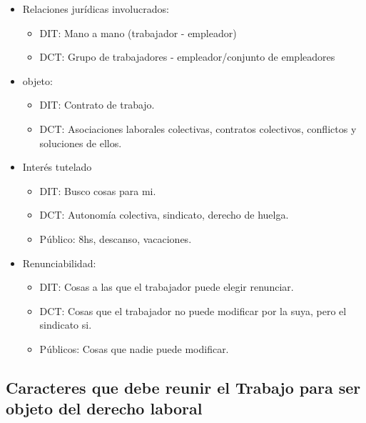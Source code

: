 \documentclass[spanish,12pt,a4paper,titlepage]{report}
\begin{document}
\begin{itemize}
\item Relaciones jurídicas involucrados:
  \begin{itemize}
  \item DIT: Mano a mano (trabajador - empleador)
  \item DCT: Grupo de trabajadores - empleador/conjunto de empleadores
  \end{itemize}
\item objeto:
  \begin{itemize}
  \item DIT: Contrato de trabajo.
  \item DCT: Asociaciones laborales colectivas, contratos colectivos, conflictos y soluciones de ellos.
  \end{itemize}
\item Interés tutelado
  \begin{itemize}
  \item DIT: Busco cosas para mi.
  \item DCT: Autonomía colectiva, sindicato, derecho de huelga.
  \item Público: 8hs, descanso, vacaciones.
  \end{itemize}
\item Renunciabilidad:
  \begin{itemize}
  \item DIT: Cosas a las que el trabajador puede elegir renunciar.
  \item DCT: Cosas que el trabajador no puede modificar por la suya, pero el sindicato si.
  \item Públicos: Cosas que nadie puede modificar.
  \end{itemize}
\end{itemize}

\subsection{Caracteres que debe reunir el Trabajo para ser objeto del derecho laboral}
\end{document}
